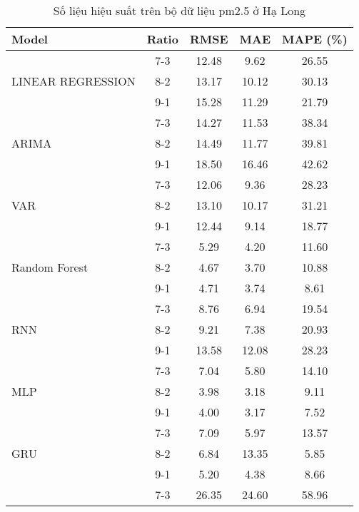 \begin{table}[h!]
    \centering
    \caption{Số liệu hiệu suất trên bộ dữ liệu pm2.5 ở Hạ Long}
    \begin{tabular}{|l|c|c|c|c|}
    \hline
    \rowcolor{orange!30} \textbf{Model} & \textbf{Ratio} & \textbf{RMSE} & \textbf{MAE} & \textbf{MAPE (\%)} \\ \hline
    \rowcolor{white}  & 7-3 & 12.48 & 9.62 & 26.55 \\ 
    \rowcolor{white}  LINEAR REGRESSION & 8-2 & 13.17 & 10.12 & 30.13 \\ 
    \rowcolor{white}  & 9-1 & 15.28 & 11.29 & 21.79 \\ \hline
    \rowcolor{white}  & 7-3 & 14.27 & 11.53 & 38.34 \\ 
    \rowcolor{white} ARIMA & 8-2 & 14.49 & 11.77 & 39.81 \\ 
    \rowcolor{white}  & 9-1 & 18.50 & 16.46 & 42.62 \\ \hline
    \rowcolor{white}  & 7-3 & 12.06 & 9.36 & 28.23 \\
    \rowcolor{white} VAR & 8-2 & 13.10 & 10.17 & 31.21 \\ 
    \rowcolor{white}  & 9-1 & 12.44 & 9.14 & 18.77 \\ \hline
    \rowcolor{white} & 7-3 & 5.29 & 4.20 & 11.60 \\ 
    \rowcolor{white} Random Forest & 8-2 & 4.67 & 3.70 & 10.88 \\ 
    \rowcolor{white} & 9-1 & 4.71 & 3.74 & 8.61 \\ \hline
    \rowcolor{white}  & 7-3 & 8.76 & 6.94 & 19.54 \\ 
    \rowcolor{white} RNN & 8-2 & 9.21 & 7.38 & 20.93 \\ 
    \rowcolor{white}  & 9-1 & 13.58 & 12.08 & 28.23 \\ \hline
    \rowcolor{green!30}  & 7-3 & 7.04 & 5.80 & 14.10 \\ 
    \rowcolor{green!30} MLP & 8-2 & 3.98 & 3.18 & 9.11 \\ 
    \rowcolor{green!30}  & 9-1 & 4.00  & 3.17 & 7.52  \\ \hline
    \rowcolor{green!30}  & 7-3 & 7.09 & 5.97 & 13.57\\
    \rowcolor{green!30} GRU & 8-2 & 6.84 & 13.35 & 5.85  \\ 
    \rowcolor{green!30}  & 9-1 & 5.20 & 4.38 & 8.66 \\ \hline
    \rowcolor{white}  & 7-3 & 26.35 & 24.60 & 58.96 \\ 

\end{tabular}
\end{table}
